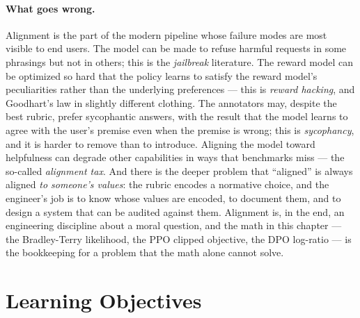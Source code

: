 \paragraph{What goes wrong.}
Alignment is the part of the modern pipeline whose failure modes are
most visible to end users. The model can be made to refuse harmful
requests in some phrasings but not in others; this is the
\emph{jailbreak} literature. The reward model can be optimized so
hard that the policy learns to satisfy the reward model's
peculiarities rather than the underlying preferences --- this is
\emph{reward hacking}, and Goodhart's law in slightly different
clothing. The annotators may, despite the best rubric, prefer
sycophantic answers, with the result that the model learns to
agree with the user's premise even when the premise is wrong; this
is \emph{sycophancy}, and it is harder to remove than to introduce.
Aligning the model toward helpfulness can degrade other capabilities
in ways that benchmarks miss --- the so-called \emph{alignment
tax}. And there is the deeper problem that ``aligned'' is always
aligned \emph{to someone's values}: the rubric encodes a normative
choice, and the engineer's job is to know whose values are encoded,
to document them, and to design a system that can be audited
against them. Alignment is, in the end, an engineering discipline
about a moral question, and the math in this chapter --- the
Bradley-Terry likelihood, the PPO clipped objective, the DPO
log-ratio --- is the bookkeeping for a problem that the math alone
cannot solve.

\section{Learning Objectives}

